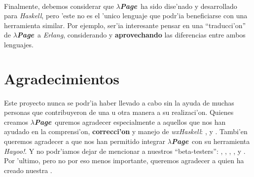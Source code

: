 \documentclass[a4paper]{article}
\newcommand{\haskell}{\textsl{Haskell}}
\newcommand{\hpage}{\textbf{\textsl{$\lambda$Page}}}
\begin{document}
\paragraph{}Finalmente, debemos considerar que \hpage\ ha sido dise'nado y desarrollado para \haskell, pero 'este no es el 'unico lenguaje que podr'ia beneficiarse con una herramienta similar.  Por ejemplo, ser'ia interesante pensar en una ``traducci'on'' de \hpage\ a \textsl{Erlang}, considerando y \textbf{aprovechando} las diferencias entre ambos lenguajes.

\newpage
\section{Agradecimientos}
\paragraph{}Este proyecto nunca se podr'ia haber llevado a cabo sin la ayuda de muchas personas que contribuyeron de una u otra manera a su realizaci'on.  Quienes creamos \hpage\ quremos agradecer especialmente a aquellos que nos han ayudado en la comprensi'on, \textbf{correcci'on} y manejo de \textsl{wxHaskell}: ,  y . Tambi'en queremos agradecer a  que nos han permitido integrar \hpage\ con su herramienta \textsl{Hayoo!}.  Y no podr'iamos dejar de mencionar a nuestros ``beta-testers'': , , , ,  y .  Por 'ultimo, pero no por eso menos importante, queremos agradecer a  quien ha creado nuestra .
\end{document}

